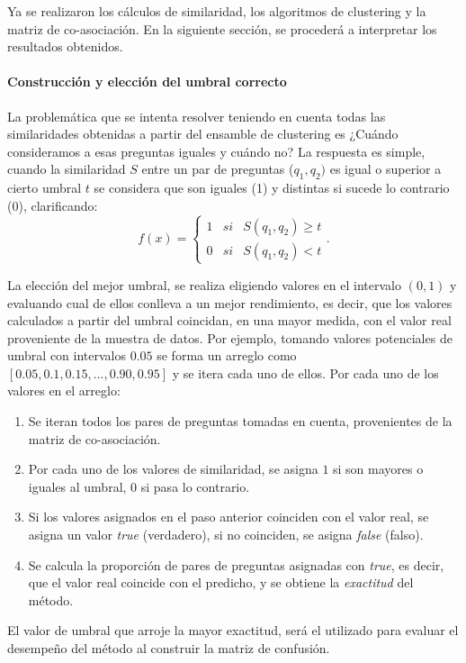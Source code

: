 Ya se realizaron los cálculos de similaridad, los algoritmos de clustering y la matriz de co-asociación. En la siguiente sección, se procederá a interpretar los resultados obtenidos.

\paragraph{Construcción y elección del umbral correcto}
La problemática que se intenta resolver teniendo en cuenta todas las similaridades obtenidas a partir del ensamble de clustering es ¿Cuándo consideramos a esas preguntas iguales y cuándo no? La respuesta es simple, cuando la similaridad \(S\) entre un par de preguntas (\(q_1,q_2)\) es igual o superior a cierto umbral \(t\) se considera que son iguales (1) y distintas si sucede lo contrario (0), clarificando:
\[f(x) = \left\{ \begin{array}{lcc} 1 & si & S(q_1, q_2)\geq t
	\\ 0 & si & S(q_1, q_2) < t
\end{array} \right..\]

La elección del mejor umbral, se realiza eligiendo valores en el intervalo \((0,1)\) y evaluando cual de ellos conlleva a un mejor rendimiento, es decir, que los valores calculados a partir del umbral coincidan, en una mayor medida, con el valor real proveniente de la muestra de datos. Por ejemplo, tomando valores potenciales de umbral con intervalos \(0.05\) se forma un arreglo como \([0.05, 0.1, 0.15, ..., 0.90, 0.95]\) y se itera cada uno de ellos. Por cada uno de los valores en el arreglo:
\begin{enumerate}
	\item Se iteran todos los pares de preguntas tomadas en cuenta, provenientes de la matriz de co-asociación.
	\item Por cada uno de los valores de similaridad, se asigna \(1\) si son mayores o iguales al umbral, \(0\) si pasa lo contrario.
	\item Si los valores asignados en el paso anterior coinciden con el valor real, se asigna un valor \textit{true} (verdadero), si no coinciden, se asigna \textit{false} (falso).
	\item Se calcula la proporción de pares de preguntas asignadas con \textit{true}, es decir, que el valor real coincide con el predicho, y se obtiene la \textit{exactitud} del método.
\end{enumerate}
El valor de umbral que arroje la mayor exactitud, será el utilizado para evaluar el desempeño del método al construir la matriz de confusión.

